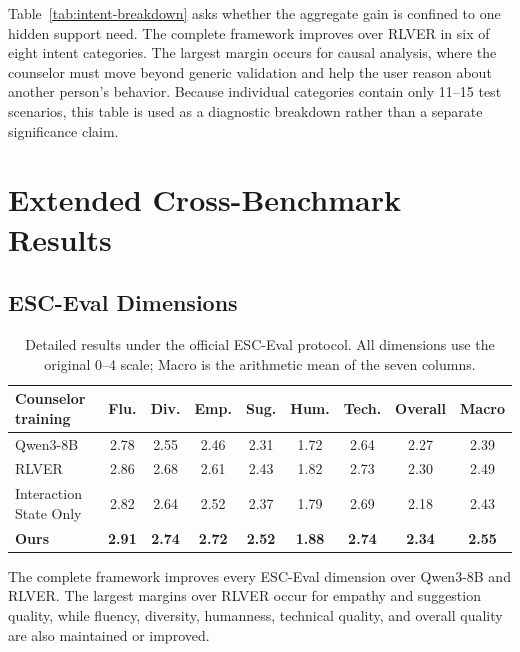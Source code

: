 

Table~\ref{tab:intent-breakdown} asks whether the aggregate gain is confined to
one hidden support need. The complete framework improves over RLVER in six of
eight intent categories. The largest margin occurs for causal analysis, where
the counselor must move beyond generic validation and help the user reason
about another person's behavior. Because individual categories contain only
11--15 test scenarios, this table is used as a diagnostic breakdown rather than
a separate significance claim.

\section{Extended Cross-Benchmark Results}
\subsection{ESC-Eval Dimensions}
\begin{table}[t]
\centering
\small
\begin{tabular}{lcccccccc}
\toprule
Counselor training
& Flu. & Div. & Emp. & Sug. & Hum. & Tech. & Overall & Macro \\
\midrule
Qwen3-8B
& 2.78 & 2.55 & 2.46 & 2.31 & 1.72 & 2.64 & 2.27 & 2.39 \\
RLVER
& 2.86 & 2.68 & 2.61 & 2.43 & 1.82 & 2.73 & 2.30 & 2.49 \\
Interaction State Only
& 2.82 & 2.64 & 2.52 & 2.37 & 1.79 & 2.69 & 2.18 & 2.43 \\
\textbf{Ours}
& \textbf{2.91} & \textbf{2.74} & \textbf{2.72} & \textbf{2.52}
& \textbf{1.88} & \textbf{2.74} & \textbf{2.34} & \textbf{2.55} \\
\bottomrule
\end{tabular}
\caption{Detailed results under the official ESC-Eval protocol. All dimensions
use the original 0--4 scale; Macro is the arithmetic mean of the seven columns.}
\label{tab:supp-esc-dimensions}
\end{table}

The complete framework improves every ESC-Eval dimension over Qwen3-8B and
RLVER. The largest margins over RLVER occur for empathy and suggestion quality,
while fluency, diversity, humanness, technical quality, and overall quality are
also maintained or improved.

